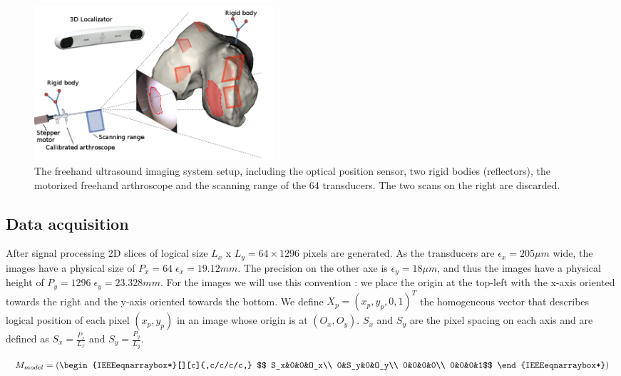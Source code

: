 \documentclass[12pt,journal,compsoc]{IEEEtran}
\begin{document}
\begin{figure}[ht!]
\centering
\includegraphics[width=3.5in]{system}
\caption{The freehand ultrasound imaging system setup, including the optical position sensor, two rigid bodies (reflectors), the motorized freehand arthroscope and the scanning range of the 64 transducers. The two scans on the right are discarded.}
\label{system2}
\end{figure}


\subsection{Data acquisition}

After signal processing 2D slices of logical size $L_x$ x $L_y = 64\times 1296$ pixels are generated. 
As the transducers are $\epsilon_x=205\mu m$ wide, the images have a physical size of $P_x = 64\;\epsilon_x=19.12mm$. 
The precision on the other axe is $\epsilon_y=18\mu m$, and thus the images have a physical height of $P_y = 1296\;\epsilon_y=23.328mm$.
For the images we will use this convention : we place the origin at the top-left with the x-axis oriented towards the right and the y-axis oriented towards the bottom. 
We define $X_p=(x_p,y_p,0,1)^T$ the homogeneous vector that describes logical position of each pixel $(x_p,y_p)$ in an image whose origin is at $(O_x,O_y)$. 
$S_x$ and $S_y$ are the pixel spacing on each axis and are defined as $S_x = \frac{P_x}{L_x}$ and $S_y = \frac{P_y}{L_y}$. 

\begin{equation}
	M_{model} = \left(
	\begin{IEEEeqnarraybox*}[][c]{,c/c/c/c,}
		$$
		S_x&0&0&O_x\\
		0&S_y&0&O_y\\
		0&0&0&0\\
		0&0&0&1%
		$$
	\end{IEEEeqnarraybox*}
\right)
\end{equation}
\end{document}
